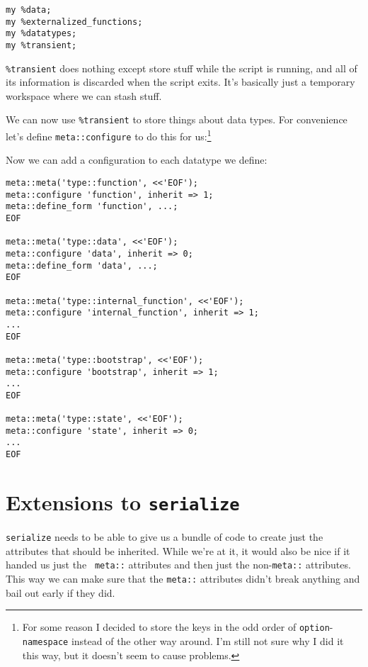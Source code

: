 \documentclass{report}
\begin{document}
\begin{verbatim}
my %data;
my %externalized_functions;
my %datatypes;
my %transient;
\end{verbatim}

    \verb|%transient| does nothing except store stuff while the script is running, and all of its information is discarded when the script exits. It's basically just a temporary workspace
    where we can stash stuff.

    We can now use \verb|%transient| to store things about data types. For convenience let's define {\tt meta::configure} to do this for us:\footnote{For some reason I decided to store the
    keys in the odd order of {\tt option}-{\tt namespace} instead of the other way around. I'm still not sure why I did it this way, but it doesn't seem to cause problems.}


    Now we can add a configuration to each datatype we define:

\begin{verbatim}
meta::meta('type::function', <<'EOF');
meta::configure 'function', inherit => 1;
meta::define_form 'function', ...;
EOF

meta::meta('type::data', <<'EOF');
meta::configure 'data', inherit => 0;
meta::define_form 'data', ...;
EOF

meta::meta('type::internal_function', <<'EOF');
meta::configure 'internal_function', inherit => 1;
...
EOF

meta::meta('type::bootstrap', <<'EOF');
meta::configure 'bootstrap', inherit => 1;
...
EOF

meta::meta('type::state', <<'EOF');
meta::configure 'state', inherit => 0;
...
EOF
\end{verbatim}

\section{Extensions to {\tt serialize}}\label{sec:cloning-and-inheritance-extensions-to-serialize}
    {\tt serialize} needs to be able to give us a bundle of code to create just the attributes that should be inherited. While we're at it, it would also be nice if it handed us just the {\tt
    meta::} attributes and then just the non-{\tt meta::} attributes. This way we can make sure that the {\tt meta::} attributes didn't break anything and bail out early if they did.
\end{document}
